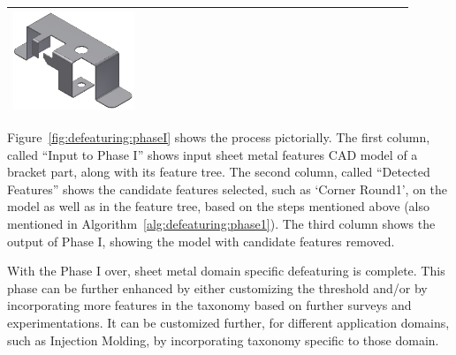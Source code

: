 \begin{minipage}[t]{\linewidth}
\begin{tabular}[!h]{@{} p{0.3\linewidth} | p{0.3\linewidth} | p{0.3\linewidth}@{}}
\includegraphics[width=0.98\linewidth]{..//Common/images/DefeatPhase_I_3} \\ \bottomrule

\end{tabular}
\label{fig:defeaturing:phaseI}
\end{minipage}

Figure~\ref{fig:defeaturing:phaseI} shows the process pictorially. The first column, called ``Input to Phase I'' shows input sheet metal features CAD model of a bracket part, along with its feature tree. The second column, called ``Detected Features'' shows the candidate features selected, such as `Corner Round1', on the model as well as in the feature tree, based on the steps mentioned above (also mentioned in Algorithm~\ref{alg:defeaturing:phase1}).  The third column shows the output of Phase I, showing the model with candidate features removed.








With the Phase I over, sheet metal domain specific defeaturing is complete. This phase can be further enhanced by either customizing the threshold and/or by incorporating more features in the taxonomy based on further surveys and experimentations. It can be customized further, for different application domains, such as Injection Molding, by incorporating taxonomy specific to those domain. 

